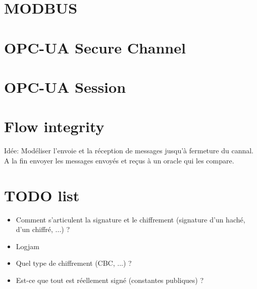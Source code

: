 \documentclass{article}
\begin{document}
\section{MODBUS}

\section{OPC-UA Secure Channel}


\section{OPC-UA Session}


\section{Flow integrity}
Idée: Modéliser l'envoie et la réception de messages jusqu'à fermeture du cannal.
A la fin envoyer les messages envoyés et reçus à un oracle qui les compare.

\section{TODO list}

\begin{itemize}
    \item Comment s'articulent la signature et le chiffrement (signature d'un haché, d'un chiffré, ...) ?
    \item Logjam
    \item Quel type de chiffrement (CBC, ...) ?
    \item Est-ce que tout est réellement signé (constantes publiques) ?
\end{itemize}
\end{document}
